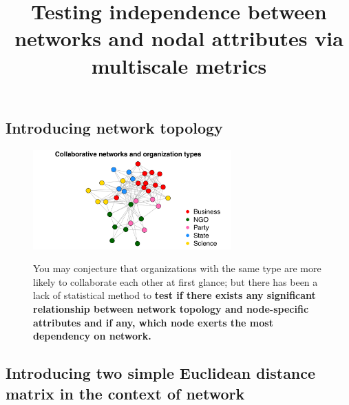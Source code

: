 \documentclass[12pt]{article}
\begin{document}
	
	\title{Testing independence between networks and nodal attributes via multiscale metrics}	
		
\subsection*{Introducing network topology}

\begin{figure}[H]
	\centering
	\includegraphics[width=3in]{../../Figure/introplot.pdf}	
	\label{fig:intro}
	\caption{You may conjecture that organizations with the same type are more likely to collaborate each other at first glance; but there has been a lack of statistical method to \textbf{test if there exists any significant relationship between network topology and node-specific attributes and if any, which node exerts the most dependency on network.}}
\end{figure}



\subsection*{Introducing two simple Euclidean distance matrix in the context of network}
\end{document}

